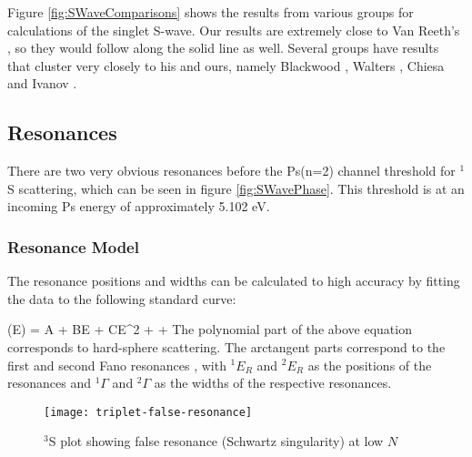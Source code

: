 \documentclass[Dissertation.tex]{subfiles}
\begin{document}
Figure \ref{fig:SWaveComparisons} shows the results from various groups for calculations of the singlet S-wave.  Our results are extremely close to Van Reeth's \cite{VanReeth2003}, so they would follow along the solid line as well.  Several groups have results that cluster very closely to his and ours, namely Blackwood \cite{Blackwood2002}, Walters \cite{Walters2004}, Chiesa \cite{Chiesa2002} and Ivanov \cite{Ivanov2002}.






\subsection{Resonances}
\label{sec:SWaveResonances}

There are two very obvious resonances before the Ps(n=2) channel threshold for $^1$S scattering, which can be seen in figure \ref{fig:SWavePhase}.  This threshold is at an incoming Ps energy of approximately 5.102 eV.  

\subsubsection{Resonance Model}
\label{sec:ResonanceModel}
The resonance positions and widths can be calculated to high accuracy by fitting the data to the following standard curve:

\beq
\label{eq:ResonanceCurve}
\delta(E) = A + BE + CE^2 + \arctan{} + \arctan{}
\eeq
The polynomial part of the above equation corresponds to hard-sphere scattering. The arctangent parts correspond to the first and second Fano resonances \cite{Fano1961,Macek1970,Hazi1979}, with $^1E_R$ and $^2E_R$ as the positions of the resonances and $^1\Gamma$ and $^2\Gamma$ as the widths of the respective resonances.


\begin{figure}[H]
	\centering
	\texttt{[image: triplet-false-resonance]}
	\caption{$^3$S plot showing false resonance (Schwartz singularity) at low $N$}
	\label{fig:triplet-false-resonance}
\end{figure}
\end{document}
